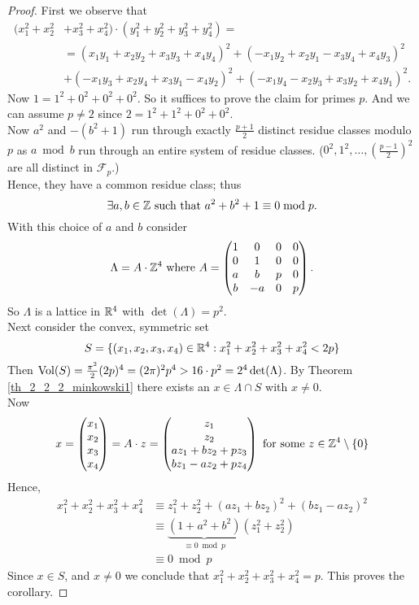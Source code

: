 \documentclass[NumTh.tex]{subfiles}
\begin{document}
\begin{proof}
  First we observe that 
  \begin{align*}
    (x_1^2 + x_2^2 &+ x_3^2 + x_4^2) \cdot (y_1^2 + y_2^2 + y_3^2 + y_4^2) = \\
    &= (x_1 y_1 + x_2 y_2 + x_3 y_3 + x_4 y_4)^2 + (-x_1 y_2 + x_2 y_1 -x_3 y_4 + x_4y_3)^2 \\
    &+ (-x_1 y_3 + x_2 y_4 + x_3 y_1 - x_4 y_2)^2 + (-x_1 y_4 - x_2 y_3 + x_3y_2 + x_4 y_1)^2 \text{.}
  \end{align*}
  Now $1 = 1^2 + 0^2 + 0^2 + 0^2$. So it suffices to prove the claim for primes $p$.
  And we can assume $p \neq 2$ since $2 = 1^2 + 1^2 +0^2 + 0^2$. \\
  Now $a^2$ and $-(b^2 + 1)$ run through exactly $\frac{p+1}{2}$ distinct residue classes modulo $p$ as $a \bmod b$ run through an entire system of residue classes. ($0^2, 1^2, \dots, \left( \frac{p-1}{2} \right)^2$ are all distinct in $\mathcal{F}_p$.)\\
  Hence, they have a common residue class; thus 
  \[ \exists a,b \in \mathbb{Z} \text{ such that } a^2 + b^2 +1 \equiv 0 \bmod p \text{.} \]
  With this choice of $a$ and $b$ consider
  \[ \Lambda = A \cdot \mathbb{Z}^4 \text{ where } A= \left( 
  \begin{matrix}
    1 & 0 & 0 & 0\\
    0 & 1 & 0 & 0\\
    a & b & p &  0\\
    b & -a & 0 & p
  \end{matrix} \right) \text{.}\]
  So $\Lambda$ is a lattice in $\mathbb{R}^4$ with $\det(\Lambda) = p^2$.\\
  Next consider the convex, symmetric set 
  \[ S = \{ (x_1,x_2,x_3,x_4) \in \mathbb{R}^4 : x_1^2 + x_2^2 + x_3^2 + x_4^2 < 2p \} \]
  Then $\operatorname{Vol}(S) = \frac{\pi^2}{2} (2p)^4 = (2 \pi)^2 p^4 > 16 \cdot p^2 = 2^4 \det(\Lambda)$.
  By Theorem \ref{th_2_2_2_minkowski1} there exists an $x \in \Lambda \cap S$ with $x \neq 0$.\\
  Now 
  \[ x = \left(
  \begin{matrix}
    x_1 \\
    x_2 \\
    x_3 \\
    x_4
  \end{matrix} \right)
  = A \cdot z = \left(
  \begin{matrix}
    z_1 \\
    z_2 \\
    a z_1 + b z_2 + p z_3 \\
    b z_1 - a z_2 + p z_4
  \end{matrix} \right) \text{ for some } z \in \mathbb{Z}^4 \setminus \{0\} \]
  Hence,
  \begin{align*}
    x_1^2 + x_2^2 + x_3^2 + x_4^2 &\equiv z_1^2 + z_2^2 + (a z_1 + b z_2)^2 + (b z_1 - a z_2)^2 \\
    &\equiv \underbrace{(1 + a^2 + b^2)}_{\equiv 0 \bmod p} (z_1^2 + z_2^2) \\
    &\equiv 0 \bmod p
  \end{align*}
  Since $x \in S$, and $x \neq 0$ we conclude that $x_1^2 + x_2^2 + x_3^2 + x_4^2 = p$.
  This proves the corollary.
\end{proof}
\end{document}
